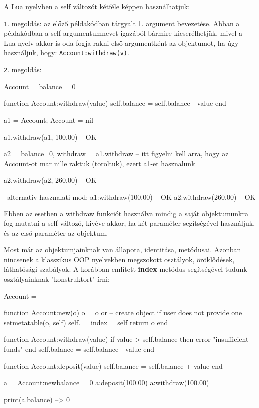 A Lua nyelvben a self változót kétféle képpen használhatjuk:

\hspace{10mm}\texttt{1}. megoldás: az előző példakódban tárgyalt 1. argument bevezetése. Abban a példakódban a self argumentumnevet igazából bármire kicserélhetjük, mivel a Lua nyelv akkor is oda fogja rakni első argumentként az objektumot, ha úgy használjuk, hogy: \texttt{Account:withdraw(v)}.

\hspace{10mm}\texttt{2}. megoldás:
\begin{lua}
Account = {balance = 0}

function Account:withdraw(value)
	self.balance = self.balance - value
end

a1 = Account; Account = nil

a1.withdraw(a1, 100.00)   -- OK

a2 = {balance=0, withdraw = a1.withdraw} -- itt figyelni kell arra, hogy az Account-ot mar nille raktuk (toroltuk), ezert a1-et hasznalunk 

a2.withdraw(a2, 260.00) -- OK

--alternativ hasznalati mod:
a1:withdraw(100.00) -- OK
a2:withdraw(260.00) -- OK
\end{lua}
Ebben az esetben a withdraw funkciót használva mindig a saját objektumunkra fog mutatni a self változó, kivéve akkor, ha két paraméter segítségével használjuk, és az első paraméter az objektum.

Most már az objektumjainknak van állapota, identitása, metódusai. Azonban nincsenek a klasszikus OOP nyelvekben megszokott osztályok, öröklődések, láthatósági szabályok.\pagebreak
{}
A korábban említett \detokenize{__}\textbf{index} metódus segítségével tudunk osztályainknak "konstruktort" írni:
\begin{lua}
Account = {}

function Account:new(o)
	o = o or {}   -- create object if user does not provide one
	setmetatable(o, self)
	self.__index = self
	return o
end

function Account:withdraw(value)
	if value > self.balance then error "insufficient funds" end
	self.balance = self.balance - value
end

function Account:deposit(value)
	self.balance = self.balance + value
end

a = Account:new{balance = 0}
a:deposit(100.00)
a:withdraw(100.00)

print(a.balance) --> 0
\end{lua}

